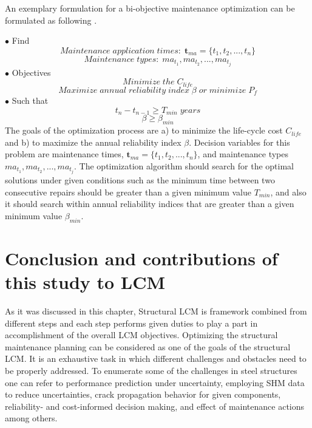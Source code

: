 An exemplary formulation for a bi-objective maintenance optimization can be formulated as following \citep{OKASHA2009460}. 

\noindent
$\bullet$ Find
\begin{equation}
Maintenance \; application\; times: \; \textbf{t}_{ma}=\{ t_1, t_2, ..., t_n\} 
\label{eq:1}
\end{equation}
\begin{equation}
Maintenance \; types: \; ma_{t_1}, ma_{t_2}, ..., ma_{t_j}
\label{eq:2}
\end{equation}
$\bullet$ Objectives
\begin{equation}
Minimize \; the \; C_{life} 
\label{eq:3}
\end{equation}
\begin{equation}
Maximize \; annual \; reliability \; index \; \beta \; or \; minimize \; P_f 
\label{eq:4}
\end{equation}
$\bullet$ Such that
\begin{equation}
t_n-t_{n-1}\geq  T_{min} \; years
\label{eq:5}
\end{equation}
\begin{equation}
\beta \geq \beta_{min}
\label{eq:6}
\end{equation}
The goals of the optimization process are a) to minimize the life-cycle cost $C_{life}$ and b) to 
maximize the annual reliability index $\beta$. Decision variables for this problem are maintenance times, $\textbf{t}_{ma}=\{ t_1, t_2, ..., t_n\}$, and maintenance types $ma_{t_1}, ma_{t_2}, ..., 
ma_{t_j}$. The optimization algorithm should search for the optimal solutions under given conditions such as the minimum time between two consecutive repairs should be greater than a given minimum
value $T_{min}$, and also it should search within annual reliability indices that are greater than a given minimum value $\beta_{min}$.


\section{Conclusion and contributions of this study to LCM}
\label{conclusion}
\noindent
As it was discussed in this chapter, Structural LCM is framework combined from different steps and each step performs given duties to play a part in accomplishment of the overall LCM objectives.
Optimizing the structural maintenance planning can be considered as one of the goals of the structural LCM. It is an exhaustive task in which different challenges and obstacles need to be 
properly addressed. To  enumerate some of the challenges in steel structures one can refer to performance prediction under uncertainty, employing SHM data to reduce uncertainties, crack propagation 
behavior for given components, reliability- and cost-informed decision making, and effect of maintenance actions among others. 

